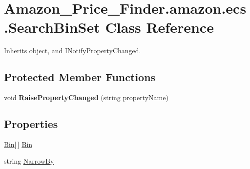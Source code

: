 \hypertarget{class_amazon___price___finder_1_1amazon_1_1ecs_1_1_search_bin_set}{\section{Amazon\-\_\-\-Price\-\_\-\-Finder.\-amazon.\-ecs.\-Search\-Bin\-Set Class Reference}
\label{class_amazon___price___finder_1_1amazon_1_1ecs_1_1_search_bin_set}
}


 




Inherits object, and I\-Notify\-Property\-Changed.

\subsection*{Protected Member Functions}
\begin{DoxyCompactItemize}
\item 
\hypertarget{class_amazon___price___finder_1_1amazon_1_1ecs_1_1_search_bin_set_a42a602951e2b9f1da82eee534661339f}{void {\bfseries Raise\-Property\-Changed} (string property\-Name)}\label{class_amazon___price___finder_1_1amazon_1_1ecs_1_1_search_bin_set_a42a602951e2b9f1da82eee534661339f}

\end{DoxyCompactItemize}
\subsection*{Properties}
\begin{DoxyCompactItemize}
\item 
\hypertarget{class_amazon___price___finder_1_1amazon_1_1ecs_1_1_search_bin_set_abefb15340c07fc4da8fbf4f8e73ad2c8}{\hyperlink{class_amazon___price___finder_1_1amazon_1_1ecs_1_1_bin}{Bin}\mbox{[}$\,$\mbox{]} \hyperlink{class_amazon___price___finder_1_1amazon_1_1ecs_1_1_search_bin_set_abefb15340c07fc4da8fbf4f8e73ad2c8}{Bin}}\label{class_amazon___price___finder_1_1amazon_1_1ecs_1_1_search_bin_set_abefb15340c07fc4da8fbf4f8e73ad2c8}

\begin{DoxyCompactList}\small\item\em \end{DoxyCompactList}\item 
\hypertarget{class_amazon___price___finder_1_1amazon_1_1ecs_1_1_search_bin_set_a9a1e92aa4d7d666f11e69a8aa0c71f8d}{string \hyperlink{class_amazon___price___finder_1_1amazon_1_1ecs_1_1_search_bin_set_a9a1e92aa4d7d666f11e69a8aa0c71f8d}{Narrow\-By}}\label{class_amazon___price___finder_1_1amazon_1_1ecs_1_1_search_bin_set_a9a1e92aa4d7d666f11e69a8aa0c71f8d}

\begin{DoxyCompactList}\small\item\em \end{DoxyCompactList}\end{DoxyCompactItemize}
